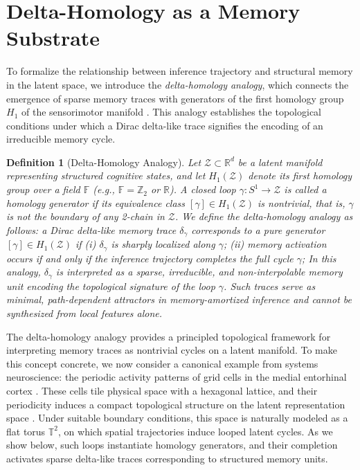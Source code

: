 \documentclass[lettersize,journal]{IEEEtran}
\newtheorem{definition}{Definition}
\begin{document}
\section{Delta-Homology as a Memory Substrate}
\label{sec:delta}

To formalize the relationship between inference trajectory and structural memory in the latent space, we introduce the \emph{delta-homology analogy}, which connects the emergence of sparse memory traces with generators of the first homology group \( H_1 \) of the sensorimotor manifold \cite{sohn2021network}. This analogy establishes the topological conditions under which a Dirac delta-like trace \cite{richards1995theory} signifies the encoding of an irreducible memory cycle.

\begin{definition}[Delta-Homology Analogy]
Let \( \mathcal{Z} \subset \mathbb{R}^d \) be a latent manifold representing structured cognitive states, and let \( H_1(\mathcal{Z}) \) denote its first homology group over a field \( \mathbb{F} \) (e.g., \( \mathbb{F} = \mathbb{Z}_2 \) or \( \mathbb{R} \)). A closed loop \( \gamma: S^1 \rightarrow \mathcal{Z} \) is called a \emph{homology generator} if its equivalence class \( [\gamma] \in H_1(\mathcal{Z}) \) is nontrivial, that is, \( \gamma \) is not the boundary of any 2-chain in \( \mathcal{Z} \).
We define the \emph{delta-homology analogy} as follows: a Dirac delta-like memory trace \( \delta_\gamma \) corresponds to a pure generator \( [\gamma] \in H_1(\mathcal{Z}) \) if
(i) \( \delta_\gamma \) is sharply localized along \( \gamma \); 
(ii) memory activation occurs if and only if the inference trajectory completes the full cycle \( \gamma \);
In this analogy, \( \delta_\gamma \) is interpreted as a sparse, irreducible, and non-interpolable memory unit encoding the topological signature of the loop \( \gamma \). Such traces serve as minimal, path-dependent attractors in memory-amortized inference and cannot be synthesized from local features alone.
\end{definition}

The delta-homology analogy provides a principled topological framework for interpreting memory traces as nontrivial cycles on a latent manifold. To make this concept concrete, we now consider a canonical example from systems neuroscience: the periodic activity patterns of grid cells in the medial entorhinal cortex \cite{moser2015place}. These cells tile physical space with a hexagonal lattice, and their periodicity induces a compact topological structure on the latent representation space \cite{stemmler2015connecting}. Under suitable boundary conditions, this space is naturally modeled as a flat torus \( \mathbb{T}^2 \), on which spatial trajectories induce looped latent cycles. As we show below, such loops instantiate homology generators, and their completion activates sparse delta-like traces corresponding to structured memory units. %
\end{document}
